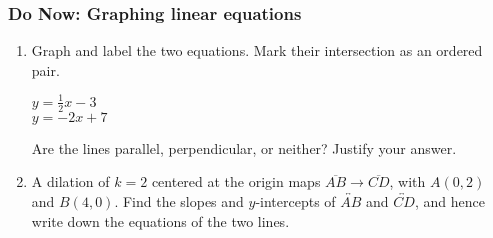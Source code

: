 \documentclass[12pt, twoside]{article}
\begin{document}
\subsubsection*{Do Now: Graphing linear equations}
  \begin{enumerate}

\item Graph and label the two equations. Mark their intersection as an ordered pair.

  \begin{multicols}{2}
    $y = \frac{1}{2}x-3$ \\
    $y = -2x + 7$
  \end{multicols}
  Are the lines parallel, perpendicular, or neither? Justify your answer.
  \vspace{1.5cm}

  \begin{center} %
  \end{center}


    \item A dilation of $k=2$ centered at the origin maps $\overline{AB} \rightarrow \overline{CD}$, with $A(0,2)$ and $B(4,0)$. Find the slopes and $y$-intercepts of $\overleftrightarrow{AB}$ and $\overleftrightarrow{CD}$, and hence write down the equations of the two lines.

  \end{enumerate}
  \setcounter{page}{1}
  \newpage
\end{document}
